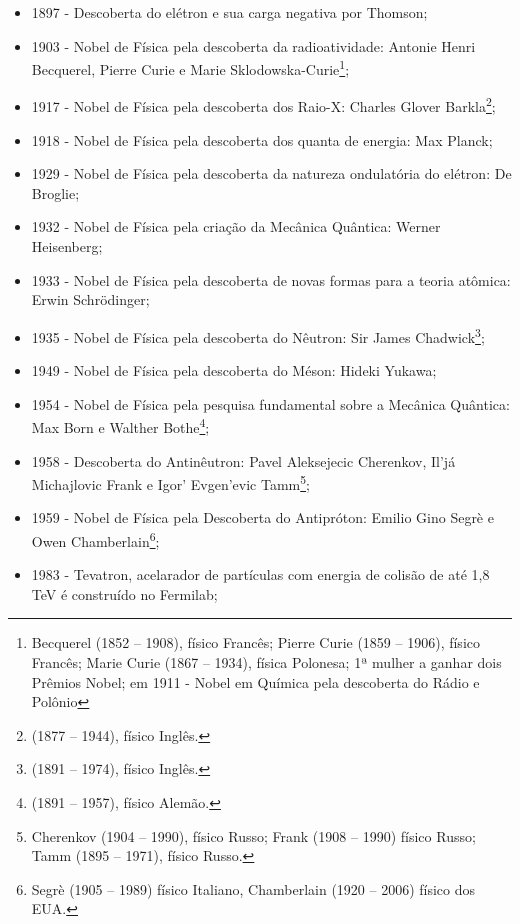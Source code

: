 \begin{itemize}
   \item 1897 - Descoberta do elétron e sua carga negativa por Thomson;
   \item 1903 - Nobel de Física pela descoberta da radioatividade: Antonie Henri Becquerel, Pierre Curie e Marie Sklodowska-Curie\footnote{Becquerel (1852 -- 1908), físico Francês; Pierre Curie (1859 -- 1906), físico Francês; Marie Curie (1867 -- 1934), física Polonesa; 1ª mulher a ganhar dois Prêmios Nobel; em 1911 - Nobel em Química pela descoberta do Rádio e Polônio};
   \item 1917 - Nobel de Física pela descoberta dos Raio-X: Charles Glover Barkla\footnote{(1877 -- 1944), físico Inglês.};
   \item 1918 - Nobel de Física pela descoberta dos quanta de energia: Max Planck;
   \item 1929 - Nobel de Física pela descoberta da natureza ondulatória do elétron: De Broglie;
   \item 1932 - Nobel de Física pela criação da Mecânica Quântica: Werner Heisenberg;
   \item 1933 - Nobel de Física pela descoberta de novas formas para a teoria atômica: Erwin Schrödinger;
   \item 1935 - Nobel de Física pela descoberta do Nêutron: Sir James Chadwick\footnote{(1891 -- 1974), físico Inglês.};
   \item 1949 - Nobel de Física pela descoberta do Méson: Hideki Yukawa;
   \item 1954 - Nobel de Física pela pesquisa fundamental sobre a Mecânica Quântica: Max Born e Walther Bothe\footnote{(1891 -- 1957), físico Alemão.};
   \item 1958 - Descoberta do Antinêutron: Pavel Aleksejecic Cherenkov, Il'já Michajlovic Frank e Igor' Evgen'evic Tamm\footnote{Cherenkov (1904 -- 1990), físico Russo; Frank (1908 -- 1990) físico Russo; Tamm (1895 -- 1971), físico Russo.};
   \item 1959 - Nobel de Física pela Descoberta do Antipróton: Emilio Gino Segrè e Owen Chamberlain\footnote{Segrè (1905 -- 1989) físico Italiano, Chamberlain (1920 -- 2006) físico dos EUA.};
   \item 1983 - Tevatron, acelarador de partículas com energia de colisão de até 1,8 TeV é construído no Fermilab;

\end{itemize}
